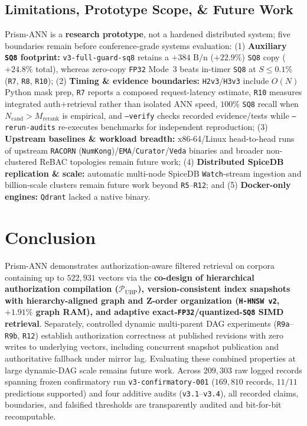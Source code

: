 \documentclass[conference]{IEEEtran}
\begin{document}
\subsection{Limitations, Prototype Scope, \& Future Work}
Prism-ANN is a \textbf{research prototype}, not a hardened distributed system; five boundaries remain before conference-grade systems evaluation: (1) \textbf{Auxiliary \texttt{SQ8} footprint:} \texttt{v3-full-guard-sq8} retains a $+384\text{ B/n}$ ($+22.9\%$) \texttt{SQ8} copy ($+24.8\%$ total), whereas zero-copy \texttt{FP32} Mode~3 beats in-timer \texttt{SQ8} at $S \le 0.1\%$ (\texttt{R7}, \texttt{R8}, \texttt{R10}); (2) \textbf{Timing \& evidence boundaries:} \texttt{H2v3}/\texttt{H3v3} include $O(N)$ Python mask prep, \texttt{R7} reports a composed request-latency estimate, \texttt{R10} measures integrated auth+retrieval rather than isolated ANN speed, $100\%$ \texttt{SQ8} recall when $N_{\text{cand}} > M_{\text{rerank}}$ is empirical, and \texttt{--verify} checks recorded evidence/tests while \texttt{--rerun-audits} re-executes benchmarks for independent reproduction; (3) \textbf{Upstream baselines \& workload breadth:} x86-64/Linux head-to-head runs of upstream \texttt{RACORN} (\texttt{NumKong})/\texttt{EMA}/\texttt{Curator}/\texttt{Veda} binaries and broader non-clustered ReBAC topologies remain future work; (4) \textbf{Distributed SpiceDB replication \& scale:} automatic multi-node SpiceDB \texttt{Watch}-stream ingestion and billion-scale clusters remain future work beyond \texttt{R5}--\texttt{R12}; and (5) \textbf{Docker-only engines:} \texttt{Qdrant} lacked a native binary.

\section{Conclusion}
\label{sec:conclusion}

Prism-ANN demonstrates authorization-aware filtered retrieval on corpora containing up to $522{,}931$ vectors via the \textbf{co-design of hierarchical authorization compilation ($\mathcal{P}_{\text{UBP}}$), version-consistent index snapshots with hierarchy-aligned graph and Z-order organization (\texttt{H-HNSW v2}, $+1.91\%$ graph RAM), and adaptive exact-\texttt{FP32}/quantized-\texttt{SQ8} SIMD retrieval}. Separately, controlled dynamic multi-parent DAG experiments (\texttt{R9a}--\texttt{R9b}, \texttt{R12}) establish authorization correctness at published revisions with zero writes to underlying vectors, including concurrent snapshot publication and authoritative fallback under mirror lag. Evaluating these combined properties at large dynamic-DAG scale remains future work. Across $209{,}303$ raw logged records spanning frozen confirmatory run \texttt{v3-confirmatory-001} ($169{,}810$ records, $11/11$ predictions supported) and four additive audits (\texttt{v3.1}--\texttt{v3.4}), all recorded claims, boundaries, and falsified thresholds are transparently audited and bit-for-bit recomputable.
\end{document}
